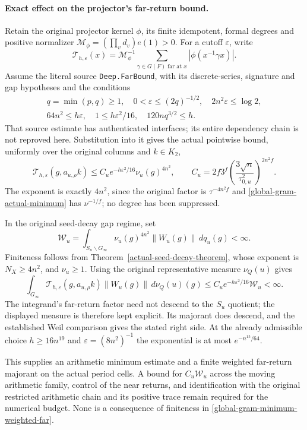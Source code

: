 \paragraph{Exact effect on the projector's far-return bound.}
Retain the original projector kernel $\phi$, its finite idempotent,
formal degrees and positive normalizer
$\mathcal M_\phi=(\prod_vd_v)e(1)>0$.
For a cutoff $\varepsilon$, write
\[
 \mathcal T_{h,\varepsilon}(x)=
    \mathcal M_\phi^{-1}\sum_{\gamma\in G(F)\text{ far at }x}
                                  |\phi(x^{-1}\gamma x)|.
\]
Assume the literal source \texttt{Deep.FarBound}, with its
discrete-series, signature and gap hypotheses and the conditions
\[
 \begin{gathered}
 q=\min(p,q)\ge1,\quad0<\varepsilon\le(2q)^{-1/2},\quad
  2n^2\varepsilon\le\log2,\\
 64n^2\le h\varepsilon,\quad
 1\le h\varepsilon^2/16,\quad120nq^{3/2}\le h.
 \end{gathered}
\]
That source estimate has authenticated interfaces; its entire
dependency chain is not reproved here.  Substitution into it gives
the actual pointwise bound, uniformly over the original columns
and $k\in K_2$,
\begin{equation}\label{global-gram-minimum-far}
 \mathcal T_{h,\varepsilon}(g,a_{u,\rho}k)
 \le C_u e^{-h\varepsilon^2/16}\nu_u(g)^{4n^2},\qquad
 C_u=2f3^f\left(\frac{3\sqrt n}{\tau_{0,u}^2}\right)^{2n^2f}.
\end{equation}
The exponent is exactly $4n^2$, since the original factor is
$\tau^{-4n^2f}$ and \eqref{global-gram-actual-minimum} has
$\nu^{-1/f}$; no degree has been suppressed.

In the original seed-decay gap regime, set
\[
 \mathcal W_u=\int_{S_u\backslash G_\infty}
                \nu_u(g)^{4n^2}\|W_u(g)\|\,dq_u(g)<\infty.
\]
Finiteness follows from Theorem~\ref{actual-seed-decay-theorem},
whose exponent is $N_X\ge4n^2$, and $\nu_u\ge1$.
Using the original representative measure $\nu_Q(u)$ gives
\begin{equation}\label{global-gram-minimum-weighted-far}
 \int_{G_\infty}\mathcal T_{h,\varepsilon}(g,a_{u,\rho}k)
                      \|W_u(g)\|\,d\nu_Q(u)(g)
          \le C_u e^{-h\varepsilon^2/16}\mathcal W_u<\infty.
\end{equation}
The integrand's far-return factor need not descend to the
$S_u$ quotient; the displayed measure is therefore kept
explicit.  Its majorant does descend, and the established
Weil comparison gives the stated right side.  At the already
admissible choice $h\ge16n^{19}$ and
$\varepsilon=(8n^2)^{-1}$ the exponential is at most
$e^{-n^{15}/64}$.\cite{global-gram-minimum-source}

This supplies an arithmetic minimum estimate and a finite weighted
far-return majorant on the actual period cells.  A bound for
$C_u\mathcal W_u$ across the moving arithmetic family, control
of the near returns, and identification with the original
restricted arithmetic chain and its positive trace remain required
for the numerical budget.  None is a consequence of finiteness
in \eqref{global-gram-minimum-weighted-far}.

